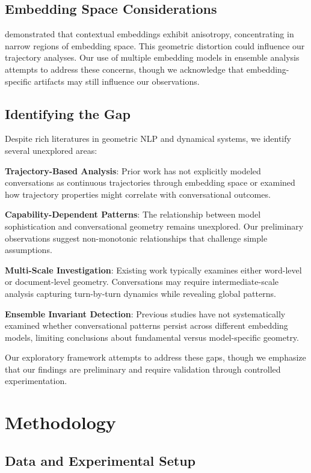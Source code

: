 \documentclass[11pt,letterpaper]{article}
\begin{document}
\subsection{Embedding Space Considerations}

\citet{ethayarajh2019contextual} demonstrated that contextual embeddings exhibit anisotropy, concentrating in narrow regions of embedding space. This geometric distortion could influence our trajectory analyses. Our use of multiple embedding models in ensemble analysis attempts to address these concerns, though we acknowledge that embedding-specific artifacts may still influence our observations.

\subsection{Identifying the Gap}

Despite rich literatures in geometric NLP and dynamical systems, we identify several unexplored areas:

\textbf{Trajectory-Based Analysis}: Prior work has not explicitly modeled conversations as continuous trajectories through embedding space or examined how trajectory properties might correlate with conversational outcomes.

\textbf{Capability-Dependent Patterns}: The relationship between model sophistication and conversational geometry remains unexplored. Our preliminary observations suggest non-monotonic relationships that challenge simple assumptions.

\textbf{Multi-Scale Investigation}: Existing work typically examines either word-level or document-level geometry. Conversations may require intermediate-scale analysis capturing turn-by-turn dynamics while revealing global patterns.

\textbf{Ensemble Invariant Detection}: Previous studies have not systematically examined whether conversational patterns persist across different embedding models, limiting conclusions about fundamental versus model-specific geometry.

Our exploratory framework attempts to address these gaps, though we emphasize that our findings are preliminary and require validation through controlled experimentation.

\section{Methodology}

\subsection{Data and Experimental Setup}
\end{document}
